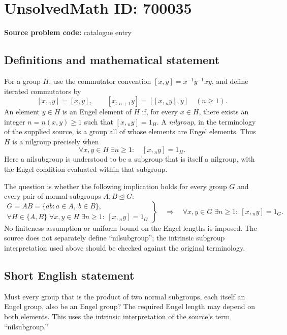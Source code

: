 \documentclass[11pt]{article}
\begin{document}
\section*{UnsolvedMath ID: 700035}
\textbf{Source problem code:} catalogue entry
\subsection{Definitions and mathematical statement}
For a group \(H\), use the commutator convention \([x,y]=x^{-1}y^{-1}xy\), and define iterated commutators by
\[
[x,{}_1y]=[x,y],\qquad [x,{}_{n+1}y]=[[x,{}_ny],y]\quad(n\geq 1).
\]
An element \(y\in H\) is an Engel element of \(H\) if, for every \(x\in H\), there exists an integer \(n=n(x,y)\geq 1\) such that \([x,{}_ny]=1_H\). A \emph{nilgroup}, in the terminology of the supplied source, is a group all of whose elements are Engel elements. Thus \(H\) is a nilgroup precisely when
\[
\forall x,y\in H\;\exists n\geq 1:\quad [x,{}_ny]=1_H.
\]
Here a nilsubgroup is understood to be a subgroup that is itself a nilgroup, with the Engel condition evaluated within that subgroup.

The question is whether the following implication holds for every group \(G\) and every pair of normal subgroups \(A,B\trianglelefteq G\):
\[
\left.
\begin{gathered}
G=AB=\{ab:a\in A,\ b\in B\},\\
\forall H\in\{A,B\}\;\forall x,y\in H\;\exists n\geq 1:\ [x,{}_ny]=1_G
\end{gathered}
\right\}
\quad\Longrightarrow\quad
\forall x,y\in G\;\exists n\geq 1:\ [x,{}_ny]=1_G.
\]
No finiteness assumption or uniform bound on the Engel lengths is imposed. The source does not separately define ``nilsubgroup''; the intrinsic subgroup interpretation used above should be checked against the original terminology.
\subsection{Short English statement}
Must every group that is the product of two normal subgroups, each itself an Engel group, also be an Engel group? The required Engel length may depend on both elements. This uses the intrinsic interpretation of the source's term ``nilsubgroup.''
\end{document}
